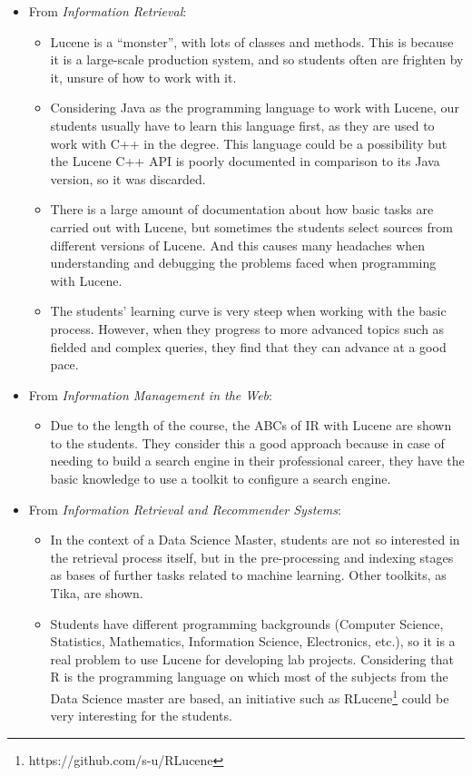 \begin{itemize}

\item From {\it Information Retrieval}:
	\begin{itemize}
		\item Lucene is a ``monster'', with lots of classes and methods. This is because it is a large-scale production system, and so students often are frighten by it, unsure of how to work with it.
	\item Considering Java as the programming language to work with Lucene, our students usually have to learn this language first, as they are used to work with C++ in the degree. This language could be a possibility but the Lucene C++ API is poorly documented in comparison to its Java version, so it was discarded.
	\item There is a large amount of documentation about how basic tasks are carried out with Lucene, but sometimes the students select sources from different versions of Lucene. And this causes many headaches when understanding and debugging the problems faced when programming with Lucene. 
	\item The students' learning curve is very steep when working with the basic process. However, when they progress to more advanced topics such as fielded and complex queries, they find that they can advance at a good pace.
	\end{itemize}

\item From {\it Information Management in the Web}:

	\begin{itemize}
		\item Due to the length of the course, the ABCs of IR with Lucene are shown to the students. They consider this a good approach because in case of needing to build a search engine in their professional career, they have the basic knowledge to use a toolkit to configure a search engine.
	\end{itemize}

\item From {\it Information Retrieval and Recommender Systems}:

	\begin{itemize}
		\item In the context of a Data Science Master, students are not so interested in the retrieval process itself, but in the pre-processing and indexing stages as bases of further tasks related to machine learning. Other toolkits, as Tika, are shown.
		\item Students have different programming backgrounds (Computer Science, Statistics, Mathematics, Information Science, Electronics, etc.), so it is a real problem to use Lucene for developing lab projects. Considering that R is the programming language on which most of the subjects from the Data Science master are based, an initiative such as RLucene\footnote{https://github.com/s-u/RLucene} could be very interesting for the students.
	\end{itemize}


\end{itemize}
